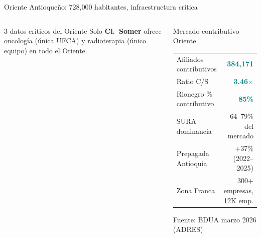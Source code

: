 \documentclass[aspectratio=169, 11pt]{beamer}
\newcommand{\highlight}[1]{\textcolor{teal}{\textbf{#1}}}
\begin{document}
{\begin{frame}{Oriente Antioqueño: 728,000 habitantes, infraestructura crítica}
\begin{columns}[T]
\begin{alertblock}{\small 3 datos críticos del Oriente}
\vspace{4pt}
Solo \textbf{Cl.\ Somer} ofrece oncología (única UFCA) y radioterapia (único equipo) en todo el Oriente.
\end{alertblock}

\vspace{4pt}
\begin{exampleblock}{\small Mercado contributivo Oriente}
\scriptsize
\begin{tabular}{@{}lr@{}}
Afiliados contributivos & \highlight{384,171} \\
Ratio C/S & \highlight{3.46$\times$} \\
Rionegro \% contributivo & \highlight{85\%} \\
SURA dominancia & 64--79\% del mercado \\
Prepagada Antioquia & +37\% (2022--2025) \\
Zona Franca & 300+ empresas, 12K emp. \\
\end{tabular}

\vspace{2pt}
{\tiny Fuente: BDUA marzo 2026 (ADRES)}
\end{exampleblock}
\end{columns}
\end{frame}
}
\end{document}
